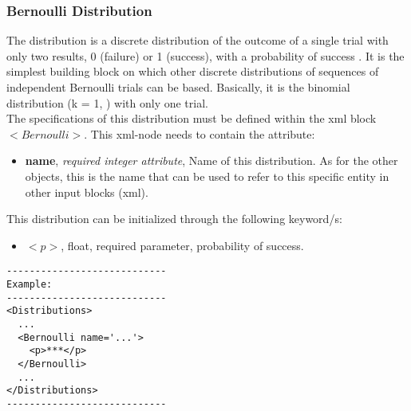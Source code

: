 \subsubsection{Bernoulli Distribution}
\label{subsubsec:Bernoulli}
The  distribution is a discrete distribution of the outcome of a single trial with only two results, 0 (failure) or 1 (success), with a probability of success . It is the simplest building block on which other discrete distributions of sequences of independent Bernoulli trials can be based. Basically, it is the binomial distribution (k = 1, ) with only one trial.
\\ The specifications of this distribution must be defined within the xml block $<Bernoulli>$. This xml-node needs to contain the attribute:
\vspace{-5mm}
\begin{itemize}
\itemsep0em
\item \textbf{name}, \textit{required integer attribute}, Name of this distribution. As for the other objects, this is the name that can be used to refer to this specific entity in other input blocks (xml).   
\end{itemize}
\vspace{-5mm}
This distribution can be initialized through the following keyword/s:
\begin{itemize}
\item $<p>$, float, required parameter, probability of success.
 \end{itemize}
\begin{lstlisting}[style=XML]
----------------------------
Example:
----------------------------
<Distributions>
  ...
  <Bernoulli name='...'>
    <p>***</p>
  </Bernoulli>
  ...
</Distributions>
----------------------------
\end{lstlisting}

